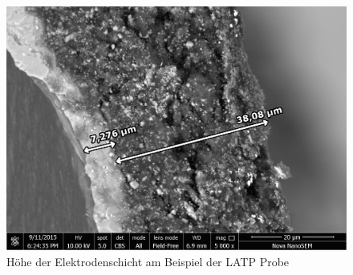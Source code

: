 \documentclass[a4paper, 11pt, headsepline,footsepline,twoside,abstract]{scrbook}
\begin{document}
\begin{figure}[t!]
	\centering
	\includegraphics[width=1.00\columnwidth]{images/LATP_Schichtdicke.jpg}
	\caption{Höhe der Elektrodenschicht am Beispiel der LATP Probe}
	\label{dicke_LATP}
\end{figure}
\end{document}
